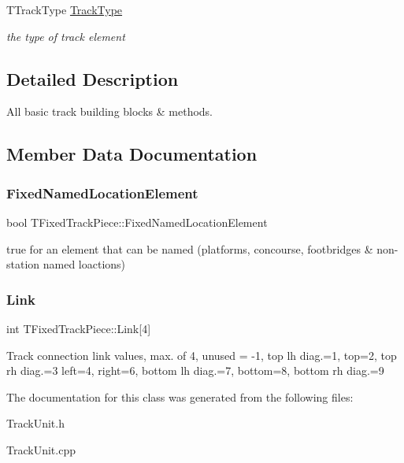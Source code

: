 \begin{DoxyCompactItemize}
\mbox{\label{class_t_fixed_track_piece_ad6c717a22333f52d1158dc57319e9e2a}} 
T\+Track\+Type \mbox{\hyperlink{class_t_fixed_track_piece_ad6c717a22333f52d1158dc57319e9e2a}{Track\+Type}}
\begin{DoxyCompactList}\small\item\em the type of track element \end{DoxyCompactList}\end{DoxyCompactItemize}


\subsection{Detailed Description}
All basic track building blocks \& methods. 

\subsection{Member Data Documentation}
\mbox{\label{class_t_fixed_track_piece_a2d225bf10a7fb1c7e8ffd924b4d4ed2a}} 
\subsubsection{\texorpdfstring{Fixed\+Named\+Location\+Element}{FixedNamedLocationElement}}
{\footnotesize\ttfamily bool T\+Fixed\+Track\+Piece\+::\+Fixed\+Named\+Location\+Element}

true for an element that can be named (platforms, concourse, footbridges \& non-\/station named loactions) \mbox{\label{class_t_fixed_track_piece_a6f604279e2311669576eb9bf36d8cfee}} 
\subsubsection{\texorpdfstring{Link}{Link}}
{\footnotesize\ttfamily int T\+Fixed\+Track\+Piece\+::\+Link\mbox{[}4\mbox{]}}

Track connection link values, max. of 4, unused = -\/1, top lh diag.=1, top=2, top rh diag.=3 left=4, right=6, bottom lh diag.=7, bottom=8, bottom rh diag.=9 

The documentation for this class was generated from the following files\+:\begin{DoxyCompactItemize}
\item 
Track\+Unit.\+h\item 
Track\+Unit.\+cpp\end{DoxyCompactItemize}
